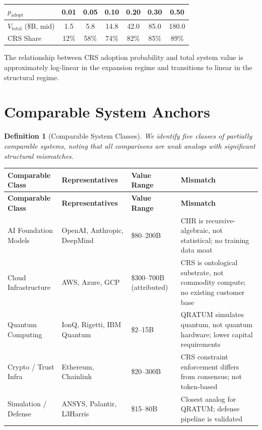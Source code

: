 \documentclass[11pt,a4paper]{article}
\newtheorem{definition}{Definition}[section]
\theoremstyle{remark}
\newcommand{\Vtot}{V_{\mathrm{total}}}
\begin{document}
\begin{center}
\renewcommand{\arraystretch}{1.2}
\begin{tabular}{lcccccc}
\toprule
$p_{\mathrm{adopt}}$ & 0.01 & 0.05 & 0.10 & 0.20 & 0.30 & 0.50 \\
\midrule
$\Vtot$ (\$B, mid) & 1.5 & 5.8 & 14.8 & 42.0 & 85.0 & 180.0 \\
CRS Share & 12\% & 58\% & 74\% & 82\% & 85\% & 89\% \\
\bottomrule
\end{tabular}
\end{center}

The relationship between CRS adoption probability and total system
value is approximately log-linear in the expansion regime and
transitions to linear in the structural regime.


\section{Comparable System Anchors}
\label{sec:comparables}

\begin{definition}[Comparable System Classes]
\label{def:comparables}
We identify five classes of partially comparable systems, noting
that all comparisons are \emph{weak analogs} with significant
structural mismatches.
\end{definition}

\renewcommand{\arraystretch}{1.3}
\begin{longtable}{p{3.2cm}p{2.8cm}p{2.5cm}p{4.5cm}}
\toprule
\textbf{Comparable Class} & \textbf{Representatives} & \textbf{Value Range} & \textbf{Mismatch} \\
\midrule
\endfirsthead
\toprule
\textbf{Comparable Class} & \textbf{Representatives} & \textbf{Value Range} & \textbf{Mismatch} \\
\midrule
\endhead
\bottomrule
\endlastfoot

AI Foundation Models & OpenAI, Anthropic, DeepMind & \$80--200B & CIIR is recursive-algebraic, not statistical; no training data moat \\

Cloud Infrastructure & AWS, Azure, GCP & \$300--700B (attributed) & CRS is ontological substrate, not commodity compute; no existing customer base \\

Quantum Computing & IonQ, Rigetti, IBM Quantum & \$2--15B & QRATUM simulates quantum, not quantum hardware; lower capital requirements \\

Crypto / Trust Infra & Ethereum, Chainlink & \$20--300B & CRS constraint enforcement differs from consensus; not token-based \\

Simulation / Defense & ANSYS, Palantir, L3Harris & \$15--80B & Closest analog for QRATUM; defense pipeline is validated \\

\end{longtable}
\end{document}
